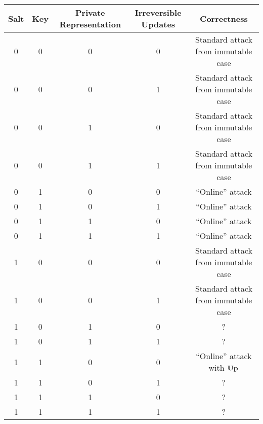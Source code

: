 \begin{center}
  \begin{tabular}{ | c | c | c | c | c | }
    \hline
    Salt & Key & Private Representation & Irreversible Updates & Correctness \\ \hline
    0 & 0 & 0 & 0 & Standard attack from immutable case \\ \hline
    0 & 0 & 0 & 1 & Standard attack from immutable case \\ \hline
    0 & 0 & 1 & 0 & Standard attack from immutable case \\ \hline
    0 & 0 & 1 & 1 & Standard attack from immutable case \\ \hline
    0 & 1 & 0 & 0 & ``Online'' attack \\ \hline
    0 & 1 & 0 & 1 & ``Online'' attack \\ \hline
    0 & 1 & 1 & 0 & ``Online'' attack \\ \hline
    0 & 1 & 1 & 1 & ``Online'' attack \\ \hline
    1 & 0 & 0 & 0 & Standard attack from immutable case \\ \hline
    1 & 0 & 0 & 1 & Standard attack from immutable case \\ \hline
    1 & 0 & 1 & 0 & ? \\ \hline
    1 & 0 & 1 & 1 & ? \\ \hline
    1 & 1 & 0 & 0 & ``Online'' attack with $\mathbf{Up}\hspace{0.5pt}$ \\ \hline
    1 & 1 & 0 & 1 & ? \\ \hline
    1 & 1 & 1 & 0 & ? \\ \hline
    1 & 1 & 1 & 1 & ? \\
    \hline
  \end{tabular}
\end{center}

